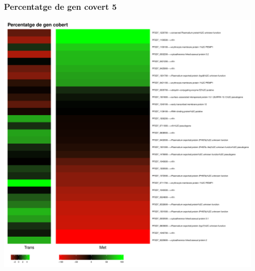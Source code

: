 \documentclass{article}\usepackage[]{graphicx}\usepackage[]{color}
\newenvironment{knitrout}{}{} %
\begin{document}
\subsubsection{Percentatge de gen covert 5}
\begin{knitrout}
\color{fgcolor}

{\centering \includegraphics[width=.9\linewidth]{figure/minimal-met_percent_5-1} 

}



\end{knitrout}
\clearpage
\end{document}
